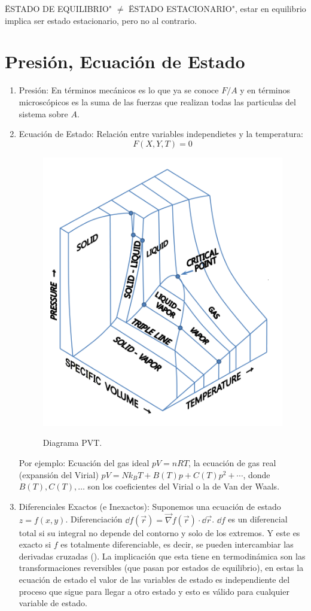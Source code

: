 \" ESTADO DE EQUILIBRIO" $\neq$ \" ESTADO ESTACIONARIO", estar en equilibrio implica ser estado estacionario, pero no al contrario.


\section{Presión, Ecuación de Estado}
\begin{enumerate}
	\item Presión: En términos mecánicos es lo que ya se conoce $F/A$ y en términos microscópicos es la suma de las fuerzas que realizan todas las particulas del sistema sobre $A$.
	\item Ecuación de Estado: Relación entre variables independietes y la temperatura:
		$$ F (X,Y,T) = 0 $$
	\begin{figure}[H]
		\centering
		\includegraphics[scale=0.2]{./img/PVT_diagram.png}
		\label{PVT}
		\caption{Diagrama PVT.}
	\end{figure}
	Por ejemplo: Ecuación del gas ideal $pV = nRT$, la ecuación de gas real (expansión del Virial) $pV = Nk_B T + B(T) p + C(T) p^2 + \cdots$, donde $B(T), C(T), \ldots$ son los coeficientes del Virial o la de Van der Waals.
	\item Diferenciales Exactos (e Inexactos): Suponemos una ecuación de estado $z = f(x,y)$. Diferenciación $\dd{f(\vec{r})} = \vec{\nabla} f(\vec{r}) \cdot \dd{\vec{r}}$. $\dd{f}$ es un diferencial total si su integral no depende del contorno y solo de los extremos. Y este es exacto si $f$ es totalmente diferenciable, es decir, se pueden intercambiar las derivadas cruzadas (). La implicación que esta tiene en termodinámica son las transformaciones reversibles (que pasan por estados de equilibrio), en estas la ecuación de estado el valor de las variables de estado es independiente del proceso que sigue para llegar a otro estado y esto es válido para cualquier variable de estado.

\end{enumerate}
